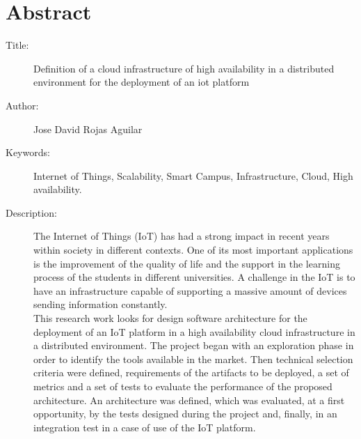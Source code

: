 \chapter*{Abstract}

\footnotesize{
\begin{description}
  \item[Title:] Definition of a cloud infrastructure of high availability in a distributed environment for the deployment of an iot platform
  \item[Author:] Jose David Rojas Aguilar
  \item[Keywords:] Internet of Things, Scalability, Smart Campus, Infrastructure, Cloud, High availability.
  \item[Description:] The Internet of Things (IoT) has had a strong impact in recent years within society in different contexts. One of its most important applications is the improvement of the quality of life and the support in the learning process of the students in different universities. A challenge in the IoT is to have an infrastructure capable of supporting a massive amount of devices sending information constantly. \\
  
  This research work looks for design software architecture for the deployment of an IoT platform in a high availability cloud infrastructure in a distributed environment. The project began with an exploration phase in order to identify the tools available in the market. Then technical selection criteria were defined, requirements of the artifacts to be deployed, a set of metrics and a set of tests to evaluate the performance of the proposed architecture. An architecture was defined, which was evaluated, at a first opportunity, by the tests designed during the project and, finally, in an integration test in a case of use of the IoT platform.
\end{description}}\normalsize
